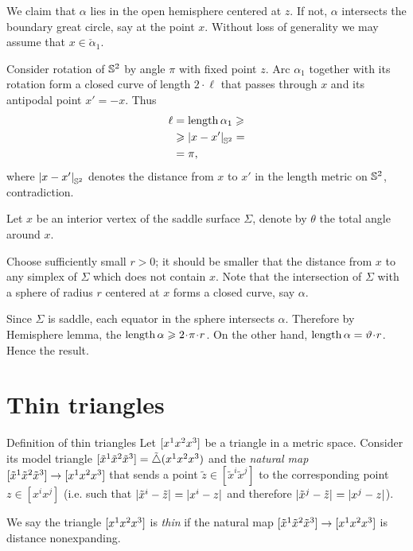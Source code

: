 We claim that $\alpha$ lies in the open hemisphere centered at $z$.  
If not, $\alpha$ intersects the boundary  great circle,
say at the point $x$.
Without loss of generality we may assume that $x\in\check\alpha_1$. 

Consider rotation of $\SS^2$ 
by angle $\pi$ with fixed point $z$.
Arc $\alpha_1$ together with its rotation form a closed curve of length $2\cdot \ell$ that passes through $x$ and its antipodal point $x'=-x$.
Thus 
\begin{align*}
\ell
&=\length \alpha_1\ge
\\
&\ge \dist{x}{x'}{\SS^2}=
\\
&=\pi,
\end{align*}
where $\dist{x}{x'}{\SS^2}$ denotes the distance from $x$ to $x'$ in the length metric on $\SS^2$, contradiction.
\qeds

Let $x$ be an interior vertex of the saddle surface $\Sigma$, denote by $\theta$ the total angle around $x$.

Choose sufficiently small $r>0$;
it should be smaller that the distance from $x$ to any simplex of $\Sigma$ which does not contain $x$.
Note that the intersection of $\Sigma$ with
a sphere of radius $r$ centered at $x$ forms a closed curve, say $\alpha$.

Since $\Sigma$ is saddle,
each equator in the sphere intersects $\alpha$. 
Therefore by Hemisphere lemma, 
the $\length\alpha\ge 2\cdot\pi\cdot r$.
On the other hand,
$\length\alpha=\theta\cdot r$.
Hence the result.
\qeds

\section{Thin triangles} \label{sec:thin-triangle} 
 
\begin{thm}{Definition of thin triangles
}\label{def:k-thin}
Let $\trig{x^1}{x^2}{x^3}$ be a triangle in a metric space.
Consider its model triangle
$\trig{\tilde x^1}{\tilde x^2}{\tilde x^3}=\modtrig0({x^1}{x^2}{x^3})$ 
and the  \emph{natural map} $\trig{\tilde x^1}{\tilde x^2}{\tilde x^3}\to \trig{x^1}{x^2}{x^3}$ 
that sends a point $\tilde z\in[\tilde x^i\tilde x^j]$ to the corresponding point $z\in[x^ix^j]$
(i.e. such that $\dist{\tilde x^i}{\tilde z}{}=\dist{x^i}{z}{}$ and therefore $\dist{\tilde x^j}{\tilde z}{}=\dist{x^j}{z}{}$).

We say the triangle $\trig{x^1}{x^2}{x^3}$ is \emph{thin} if the natural map $\trig{\tilde x^1}{\tilde x^2}{\tilde x^3}\to \trig{x^1}{x^2}{x^3}$ is distance nonexpanding.
\end{thm}



